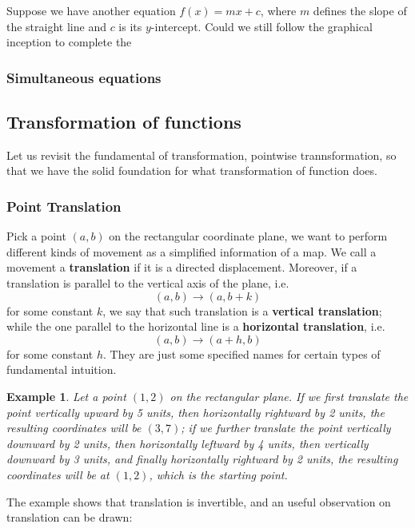 \documentclass[12pt]{article}
\newtheorem*{example}{Example}
\begin{document}
    Suppose we have another equation $f(x)=mx+c$, where $m$ defines the slope of the straight line and $c$ is its $y$-intercept. Could we still follow the graphical inception to complete the 

    \subsubsection*{Simultaneous equations}

    \subsection{Transformation of functions}

    Let us revisit the fundamental of transformation, pointwise trannsformation, so that we have the solid foundation for what transformation of function does.

    \subsubsection*{Point Translation}

    Pick a point $(a,b)$ on the rectangular coordinate plane, we want to perform different kinds of movement as a simplified information of a map. We call a movement a \textbf{translation} if it is a directed displacement. Moreover, if a translation is parallel to the vertical axis of the plane, i.e. \[(a,b)\to (a, b+k)\] for some constant $k$, we say that such translation is a \textbf{vertical translation}; while the one parallel to the horizontal line is a \textbf{horizontal translation}, i.e. \[(a,b)\to (a+h, b)\] for some constant $h$. They are just some specified names for certain types of fundamental intuition.

    \begin{example}
        Let a point $(1,2)$ on the rectangular plane. If we first translate the point vertically upward by 5 units, then horizontally rightward by 2 units, the resulting coordinates will be $(3,7)$; if we further translate the point vertically downward by 2 units, then horizontally leftward by 4 units, then vertically downward by 3 units, and finally horizontally rightward by 2 units, the resulting coordinates will be at $(1,2)$, which is the starting point.
    \end{example}

    The example shows that translation is invertible, and an useful observation on translation can be drawn:
\end{document}

